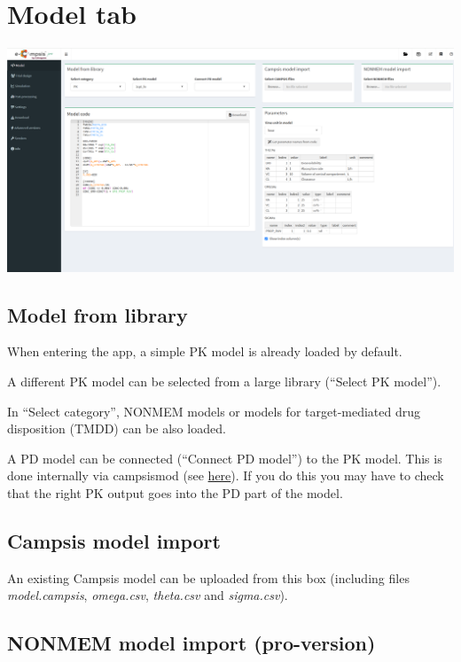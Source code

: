 \documentclass[
]{book}
\begin{document}
\chapter{Model tab}\label{model-tab}

\includegraphics{pictures/model-tab-new.png}

\section{Model from library}\label{model-from-library}

When entering the app, a simple PK model is already loaded by default.

A different PK model can be selected from a large library (``Select PK model'').

In ``Select category'', NONMEM models or models for target-mediated drug disposition (TMDD) can be also loaded.

A PD model can be connected (``Connect PD model'') to the PK model. This is done internally via campsismod (see \href{https://calvagone.github.io/campsismod.doc/articles/v06_append_pd_model.html}{here}). If you do this you may have to check that the right PK output goes into the PD part of the model.

\section{Campsis model import}\label{campsis-model-import}

An existing Campsis model can be uploaded from this box (including files \emph{model.campsis}, \emph{omega.csv}, \emph{theta.csv} and \emph{sigma.csv}).

\section{NONMEM model import (pro-version)}\label{nonmem-model-import-pro-version}
\end{document}
